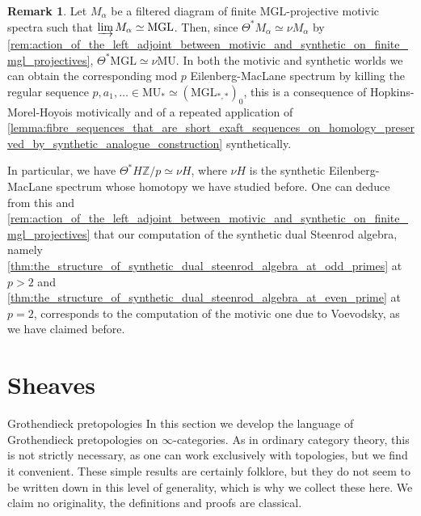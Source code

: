 \documentclass[oneside,a4paper]{amsart}
\makeatletter
\newcommand{\MU}{\mathrm{MU}} %
\newcommand{\MGL}{\mathrm{MGL}} %
\newcommand{\integralem}{H \mathbb{Z}} %
\theoremstyle{plain}
\theoremstyle{definition}
\newtheorem{rem}[thm]{Remark}
\theoremstyle{remark}
\def\subsection{\@startsection{subsection}{1}%
  \z@{.7\linespacing\@plus\linespacing}{.5\linespacing}%
  {\normalfont\bfseries\centering}}%
\makeatother
\begin{document}
\begin{rem}
\label{rem:synthetic_eilenberg_maclane_corresponds_to_motivic_one}
Let $M_{\alpha}$ be a filtered diagram of finite $\MGL$-projective motivic spectra such that $\varinjlim M_{\alpha} \simeq \MGL$. Then, since $\Theta^{*} M_{\alpha} \simeq \nu M_{\alpha}$ by \cref{rem:action_of_the_left_adjoint_between_motivic_and_synthetic_on_finite_mgl_projectives}, $\Theta^{*} \MGL \simeq \nu \MU$. In both the motivic and synthetic worlds we can obtain the corresponding mod $p$ Eilenberg-MacLane spectrum by killing the regular sequence $p, a_{1}, \ldots \in \MU_{*} \simeq (\MGL_{*, *})_{0}$, this is a consequence of Hopkins-Morel-Hoyois motivically and of a repeated application of \cref{lemma:fibre_sequences_that_are_short_exaft_sequences_on_homology_preserved_by_synthetic_analogue_construction} synthetically.

In particular, we have $\Theta^{*} \integralem / p \simeq \nu H$, where $\nu H$ is the synthetic Eilenberg-MacLane spectrum whose homotopy we have studied before. One can deduce from this and \cref{rem:action_of_the_left_adjoint_between_motivic_and_synthetic_on_finite_mgl_projectives} that our computation of the synthetic dual Steenrod algebra, namely \cref{thm:the_structure_of_synthetic_dual_steenrod_algebra_at_odd_primes} at $p > 2$ and \cref{thm:the_structure_of_synthetic_dual_steenrod_algebra_at_even_prime} at $p =2$, corresponds to the computation of the motivic one due to Voevodsky, as we have claimed before. 
\end{rem}

\FloatBarrier
\appendix

\section{Sheaves}

\subsection{Grothendieck pretopologies}
In this section we develop the language of Grothendieck pretopologies on $\infty$-categories. As in ordinary category theory, this is not strictly necessary, as one can work exclusively with topologies, but we find it convenient. These simple results are certainly folklore, but they do not seem to be written down in this level of generality, which is why we collect these here. We claim no originality, the definitions and proofs are classical. 
\end{document}
